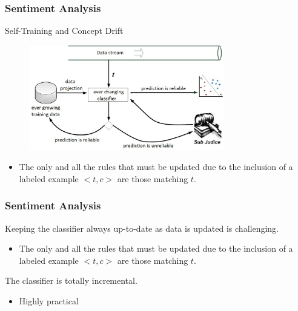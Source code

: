 \documentclass{beamer}
\begin{document}
\begin{frame}\frametitle{Sentiment Analysis}

Self-Training and Concept Drift

\begin{figure}
\centering
\includegraphics[height=1.80in]{stream.eps}
\end{figure}

\begin{itemize}
\item 
The only and all the rules that must be updated due to the inclusion of a labeled example $<t, c>$ are those matching $t$.
\end{itemize}

\end{frame}

\begin{frame}\frametitle{Sentiment Analysis}

Keeping the classifier always up-to-date as data is updated is challenging.

\begin{itemize}
\item 
The only and all the rules that must be updated due to the inclusion of a labeled example $<t, c>$ are those matching $t$.
\end{itemize}

\alert{The classifier is totally incremental.}

\begin{itemize}
\item Highly practical
\end{itemize}

\end{frame}
\end{document}

